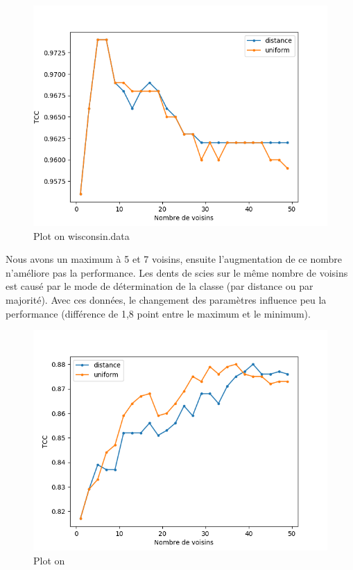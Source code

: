 \documentclass[10pt,letterpaper]{article}
\begin{document}
\begin{figure}[H]
\centering
\includegraphics[scale=0.65]{images/wisc_ppv.png}
\caption{Plot on wisconsin.data}
\end{figure}
Nous avons un maximum à 5 et 7 voisins, ensuite l’augmentation de ce nombre n’améliore pas la performance. Les dents de scies sur le même nombre de voisins est causé par le mode de détermination de la classe (par distance ou par majorité). Avec ces données, le changement des paramètres influence peu la performance (différence de 1,8 point entre le maximum et le minimum).

\begin{figure}[H]
\centering
\includegraphics[scale=0.65]{images/dj_ppv.png}
\caption{Plot on \protect{}}
\end{figure}
\end{document}
